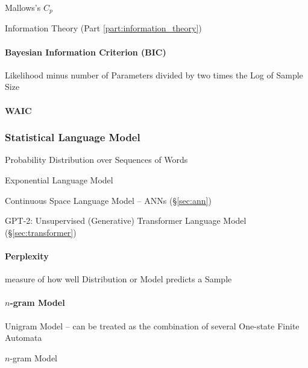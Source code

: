 Mallows's $C_p$

\fist Information Theory (Part \ref{part:information_theory})



\paragraph{Bayesian Information Criterion (BIC)}\label{sec:bic}\hfill

Likelihood minus number of Parameters divided by two times the Log of Sample
Size



\paragraph{WAIC}\label{sec:waic}\hfill



\subsubsection{Statistical Language Model}
\label{sec:statistical_language_model}

Probability Distribution over Sequences of Words

Exponential Language Model

Continuous Space Language Model -- ANNs (\S\ref{sec:ann})

GPT-2: Unsupervised (Generative) Transformer Language Model
(\S\ref{sec:transformer})



\paragraph{Perplexity}\label{sec:perplexity}\hfill

measure of how well Distribution or Model predicts a Sample




\paragraph{$n$-gram Model}\label{sec:ngram_model}\hfill

Unigram Model -- can be treated as the combination of several One-state Finite
Automata

$n$-gram Model



